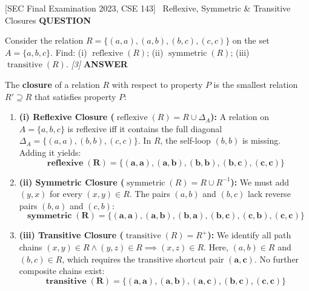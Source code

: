 \documentclass[11pt,a4paper]{article}
\newcommand{\Qlabel}{\textbf{\color{navy}\footnotesize\MakeUppercase{Question}}\par\smallskip}
\newcommand{\Alabel}{\textbf{\color{teal}\footnotesize\MakeUppercase{Answer}}\par\smallskip}
\begin{document}
\begin{exambox}{[SEC Final Examination 2023, CSE 143] \ Reflexive, Symmetric \& Transitive Closures}
\Qlabel
Consider the relation $R = \{(a,a), (a,b), (b,c), (c,c)\}$ on the set $A = \{a,b,c\}$. Find: (i) $\operatorname{reflexive}(R)$; (ii) $\operatorname{symmetric}(R)$; (iii) $\operatorname{transitive}(R)$. \hfill\textit{[3]}
\tcblower
\Alabel
The \textbf{closure} of a relation $R$ with respect to property $P$ is the smallest relation $R' \supseteq R$ that satisfies property $P$:
\begin{enumerate}
    \item \textbf{(i) Reflexive Closure ($\operatorname{reflexive}(R) = R \cup \Delta_A$):}
    A relation on $A=\{a,b,c\}$ is reflexive iff it contains the full diagonal $\Delta_A = \{(a,a), (b,b), (c,c)\}$. In $R$, the self-loop $(b,b)$ is missing. Adding it yields:
    \[
    \mathbf{\operatorname{reflexive}(R) = \{(a,a), (a,b), (b,b), (b,c), (c,c)\}}
    \]
    \item \textbf{(ii) Symmetric Closure ($\operatorname{symmetric}(R) = R \cup R^{-1}$):}
    We must add $(y,x)$ for every $(x,y) \in R$. The pairs $(a,b)$ and $(b,c)$ lack reverse pairs $(b,a)$ and $(c,b)$:
    \[
    \mathbf{\operatorname{symmetric}(R) = \{(a,a), (a,b), (b,a), (b,c), (c,b), (c,c)\}}
    \]
    \item \textbf{(iii) Transitive Closure ($\operatorname{transitive}(R) = R^+$):}
    We identify all path chains $(x,y) \in R \land (y,z) \in R \implies (x,z) \in R$.
    Here, $(a,b) \in R$ and $(b,c) \in R$, which requires the transitive shortcut pair $\mathbf{(a,c)}$. No further composite chains exist:
    \[
    \mathbf{\operatorname{transitive}(R) = \{(a,a), (a,b), (a,c), (b,c), (c,c)\}}
    \]
\end{enumerate}
\end{exambox}
\end{document}
